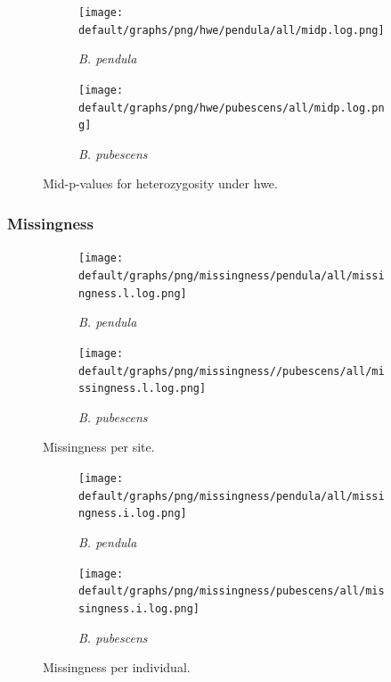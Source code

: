 \documentclass[hidelinks,11pt]{article}
\newcommand{\pendula}{\textit{B. pendula}}
\newcommand{\pubescens}{\textit{B. pubescens}}
\begin{document}
    \begin{figure}[H]
        \centering
        \begin{subfigure}[b]{0.49\textwidth}
            \centering
            \texttt{[image: default/graphs/png/hwe/pendula/all/midp.log.png]}
            \caption{\pendula{}}
        \end{subfigure}
        \hfill
        \begin{subfigure}[b]{0.49\textwidth}
            \centering
            \texttt{[image: default/graphs/png/hwe/pubescens/all/midp.log.png]}
            \caption{\pubescens{}}
        \end{subfigure}
        \caption{Mid-p-values for heterozygosity under \acrshort{hwe}.}
        \label{fig:mid-p-hwe}
    \end{figure}

    \subsubsection{Missingness}

    \begin{figure}[H]
        \centering
        \begin{subfigure}[b]{0.49\textwidth}
            \centering
            \texttt{[image: default/graphs/png/missingness/pendula/all/missingness.l.log.png]}
            \caption{\pendula{}}
        \end{subfigure}
        \hfill
        \begin{subfigure}[b]{0.49\textwidth}
            \centering
            \texttt{[image: default/graphs/png/missingness//pubescens/all/missingness.l.log.png]}
            \caption{\pubescens{}}
        \end{subfigure}
        \caption{Missingness per site.}
        \label{fig:missingness-sample}
    \end{figure}

    \begin{figure}[H]
        \centering
        \begin{subfigure}[b]{0.49\textwidth}
            \centering
            \texttt{[image: default/graphs/png/missingness/pendula/all/missingness.i.log.png]}
            \caption{\pendula{}}
        \end{subfigure}
        \hfill
        \begin{subfigure}[b]{0.49\textwidth}
            \centering
            \texttt{[image: default/graphs/png/missingness/pubescens/all/missingness.i.log.png]}
            \caption{\pubescens{}}
        \end{subfigure}
        \caption{Missingness per individual.}
        \label{fig:missingness-individual}
    \end{figure}
\end{document}
